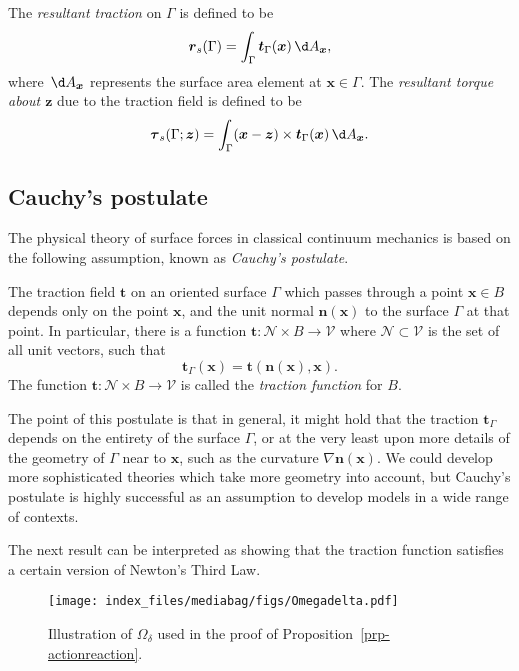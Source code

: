 \documentclass[
  letterpaper,
  DIV=11,
  numbers=noendperiod]{scrreprt}
\theoremstyle{plain}
\theoremstyle{remark}
\begin{document}
The \emph{resultant traction} on \(\Gamma\) is defined to be
\[{\boldsymbol{r}}_s(\Gamma)= \int_\Gamma {\boldsymbol{t}}_\Gamma({\boldsymbol{x}}){\,\d A_{{\boldsymbol{x}}}},\]
where \({\,\d A_{{\boldsymbol{x}}}}\) represents the surface area
element at \({\boldsymbol{x}}\in\Gamma\). The \emph{resultant torque
about \({\boldsymbol{z}}\)} due to the traction field is defined to be
\[{\boldsymbol{\tau}}_s(\Gamma;{\boldsymbol{z}})= \int_\Gamma ({\boldsymbol{x}}-{\boldsymbol{z}})\times {\boldsymbol{t}}_\Gamma({\boldsymbol{x}}){\,\d A_{{\boldsymbol{x}}}}.\]

\subsection{Cauchy's postulate}\label{cauchys-postulate}

The physical theory of surface forces in classical continuum mechanics
is based on the following assumption, known as \emph{Cauchy's
postulate}.

The traction field \({\boldsymbol{t}}\) on an oriented surface
\(\Gamma\) which passes through a point \({\boldsymbol{x}}\in B\)
depends only on the point \({\boldsymbol{x}}\), and the unit normal
\({\boldsymbol{n}}({\boldsymbol{x}})\) to the surface \(\Gamma\) at that
point. In particular, there is a function
\({\boldsymbol{t}}:{\mathcal{N}}\times B\to{\mathcal{V}}\) where
\({\mathcal{N}}\subset{\mathcal{V}}\) is the set of all unit vectors,
such that
\[{\boldsymbol{t}}_\Gamma({\boldsymbol{x}}) = {\boldsymbol{t}}({\boldsymbol{n}}({\boldsymbol{x}}),{\boldsymbol{x}}).\]
The function \({\boldsymbol{t}}:{\mathcal{N}}\times B\to{\mathcal{V}}\)
is called the \emph{traction function} for \(B\).

The point of this postulate is that in general, it might hold that the
traction \({\boldsymbol{t}}_\Gamma\) depends on the entirety of the
surface \(\Gamma\), or at the very least upon more details of the
geometry of \(\Gamma\) near to \({\boldsymbol{x}}\), such as the
curvature \(\nabla{\boldsymbol{n}}({\boldsymbol{x}})\). We could develop
more sophisticated theories which take more geometry into account, but
Cauchy's postulate is highly successful as an assumption to develop
models in a wide range of contexts.

The next result can be interpreted as showing that the traction function
satisfies a certain version of Newton's Third Law.

\begin{figure}[H]

{\centering \texttt{[image: index\_files/mediabag/figs/Omegadelta.pdf]}

}

\caption{Illustration of \(\Omega_\delta\) used in the proof of
Proposition~\ref{prp-actionreaction}.}

\end{figure}%
\end{document}
